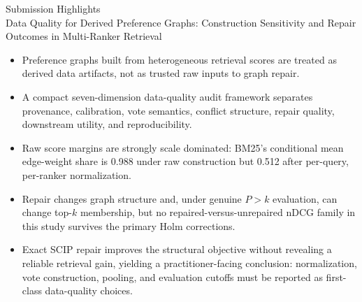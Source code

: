 \documentclass[11pt]{article}
\begin{document}
\begin{center}
{\Large Submission Highlights}\\[0.75em]
{\normalsize Data Quality for Derived Preference Graphs: Construction Sensitivity and Repair Outcomes in Multi-Ranker Retrieval}
\end{center}

\vspace{0.75em}

\begin{itemize}
  \item Preference graphs built from heterogeneous retrieval scores are treated as derived data artifacts, not as trusted raw inputs to graph repair.
  \item A compact seven-dimension data-quality audit framework separates provenance, calibration, vote semantics, conflict structure, repair quality, downstream utility, and reproducibility.
  \item Raw score margins are strongly scale dominated: BM25's conditional mean edge-weight share is 0.988 under raw construction but 0.512 after per-query, per-ranker normalization.
  \item Repair changes graph structure and, under genuine $P > k$ evaluation, can change top-$k$ membership, but no repaired-versus-unrepaired nDCG family in this study survives the primary Holm corrections.
  \item Exact SCIP repair improves the structural objective without revealing a reliable retrieval gain, yielding a practitioner-facing conclusion: normalization, vote construction, pooling, and evaluation cutoffs must be reported as first-class data-quality choices.
\end{itemize}
\end{document}
